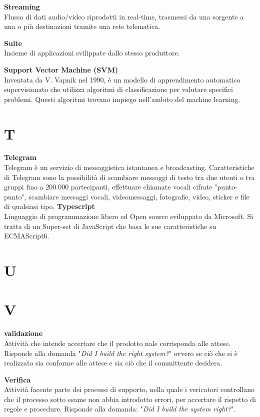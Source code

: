 \documentclass[a4paper, oneside, openany, dvipsnames, table, 12pt]{article}
\begin{document}
\textbf{Streaming} \\
Flusso di dati audio/video riprodotti in real-time, trasmessi da una sorgente a una o più destinazioni tramite una rete telematica.

\textbf{Suite} \\
Insieme di applicazioni svilippate dallo stesso produttore.

\textbf{Support Vector Machine (SVM)} \\
Inventata da V. Vapnik nel 1990, è un modello di apprendimento automatico supervisionato che utilizza algoritmi di classificazione per valutare specifici problemi. Questi algoritmi trovano impiego nell'ambito del machine learning.

\newpage
\section{T}
\textbf{Telegram} \\
Telegram è un servizio di messaggistica istantanea e broadcasting. Caratteristiche di Telegram sono la possibilità di scambiare messaggi di testo tra due utenti o tra gruppi fino a 200.000 partecipanti, effettuare chiamate vocali cifrate "punto-punto", scambiare messaggi vocali, videomessaggi, fotografie, video, sticker e file di qualsiasi tipo.
\textbf{Typescript} \\
Linguaggio di programmazione libero ed Open source sviluppato da Microsoft. Si tratta di un Super-set di JavaScript che basa le sue caratteristiche su ECMAScript6.

\newpage
\section{U}

\newpage
\section{V}

\textbf{validazione} \\
Attività che intende accertare che il prodotto nale corrisponda alle attese. Risponde
alla domanda "\textit{Did I build the right system?}" ovvero se ciò che si è realizzato sia conforme alle attese e sia ciò che il committente desidera.

\textbf{Verifica} \\
Attività facente parte dei processi di supporto, nella quale i vericatori controllano
che il processo sotto esame non abbia introdotto errori, per accertare il rispetto di
regole e procedure. Risponde alla domanda: "\textit{Did I build the system right?}".
\end{document}
